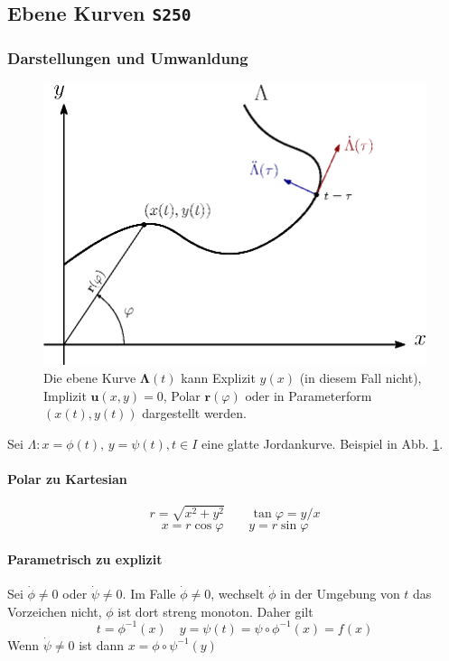 \documentclass[a4paper, twocolumn]{article}
\numberwithin{equation}{subsection}
\renewcommand{\vec}[1]{\ensuremath{\bm{#1}}}
\newcommand{\brpage}[1]{\textcolor{red!70!black}{\small\texttt{S#1}}}
\begin{document}
\subsection{Ebene Kurven \brpage{250}}

\subsubsection{Darstellungen und Umwanldung}
\begin{figure}[h]
\centering
\includegraphics[width=.9\linewidth]{fig/plane-curve.eps}
\caption{Die ebene Kurve \(\vec{\Lambda}(t)\) kann Explizit \(y(x)\) (in diesem Fall nicht), Implizit \(\vec{u}(x,y) = 0\), Polar \(\vec{r}(\varphi)\) oder in Parameterform \((x(t), y(t))\) dargestellt werden.}
\label{fig:plane-curve}
\end{figure}

Sei \(\Lambda: x = \phi(t),\, y = \psi(t), t\in I\) eine glatte Jordankurve.
Beispiel in Abb. \ref{fig:plane-curve}.

\paragraph{Polar zu Kartesian}
\[
    r = \sqrt{x^2 + y^2}
    \qquad
    \tan\varphi = y/x
\]
\[
    x = r \cos\varphi
    \qquad
    y = r \sin\varphi
\]

\paragraph{Parametrisch zu explizit}
Sei \(\dot{\phi} \neq 0\) oder \(\dot{\psi} \neq 0\). Im Falle \(\dot{\phi} \neq 0\), wechselt \(\dot\phi\) in der Umgebung von \(t\) das Vorzeichen nicht, \(\phi\) ist dort streng monoton.
Daher gilt
\[
    t = \phi^{-1}(x) \quad y = \psi(t) = \psi \circ \phi^{-1}(x) = f(x)
\]
Wenn \(\dot{\psi} \neq 0\) ist dann \(x = \phi \circ \psi^{-1}(y)\)
\end{document}
